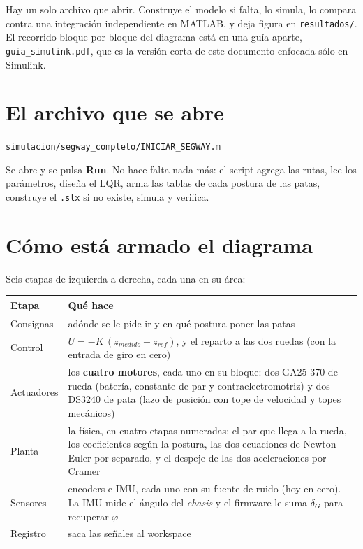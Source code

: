 \documentclass[11pt,a4paper]{report}
\begin{document}
\begin{idea}
Hay un solo archivo que abrir. Construye el modelo si falta, lo simula, lo compara contra una
integración independiente en MATLAB, y deja figura en \texttt{resultados/}. El recorrido
bloque por bloque del diagrama está en una guía aparte, \texttt{guia\_simulink.pdf}, que es la
versión corta de este documento enfocada sólo en Simulink.
\end{idea}

\section{El archivo que se abre}

\begin{center}
\texttt{simulacion/segway\_completo/INICIAR\_SEGWAY.m}
\end{center}

Se abre y se pulsa \textbf{Run}. No hace falta nada más: el script agrega las rutas, lee los
parámetros, diseña el LQR, arma las tablas de cada postura de las patas, construye el
\texttt{.slx} si no existe, simula y verifica.

\section{Cómo está armado el diagrama}

Seis etapas de izquierda a derecha, cada una en su área:

\begin{center}
\small
\begin{tabular}{@{}lp{11.2cm}@{}}
\toprule
\textbf{Etapa} & \textbf{Qué hace} \\
\midrule
Consignas & adónde se le pide ir y en qué postura poner las patas \\
Control & $U = -K\,(z_{medido} - z_{ref})$, y el reparto a las dos ruedas (con la entrada de giro
en cero) \\
Actuadores & los \textbf{cuatro motores}, cada uno en su bloque: dos GA25-370 de rueda (batería,
constante de par y contraelectromotriz) y dos DS3240 de pata (lazo de posición con tope de
velocidad y topes mecánicos) \\
Planta & la física, en cuatro etapas numeradas: el par que llega a la rueda, los coeficientes
según la postura, las dos ecuaciones de Newton--Euler por separado, y el despeje de las dos
aceleraciones por Cramer \\
Sensores & encoders e IMU, cada uno con su fuente de ruido (hoy en cero). La IMU mide el ángulo
del \emph{chasis} y el firmware le suma $\delta_G$ para recuperar $\varphi$ \\
Registro & saca las señales al workspace \\
\bottomrule
\end{tabular}
\end{center}
\end{document}
